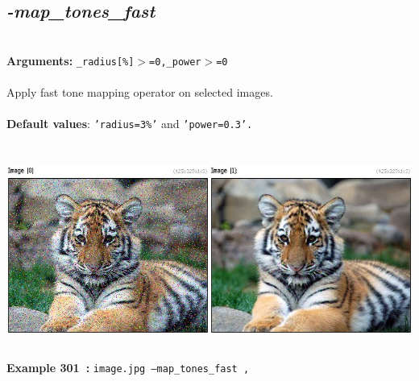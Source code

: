 \documentclass[a4paper,11pt,twoside]{book}
\begin{document}
\subsection{\emph{-map\_tones\_fast} }\vspace*{-0.5em}
~\\\textbf{Arguments: } 
{\small \texttt{\_radius[\%]$>$=0,\_power$>$=0}}\\~\\
Apply fast tone mapping operator on selected images.
~\\~\\\textbf{Default values}: {\small \texttt{'radius=3\%'} and \texttt{'power=0.3'.}}
\begin{center}\includegraphics[keepaspectratio=true,height=7cm,width=\textwidth]{img/gmic_def301.jpg}\\
{\footnotesize \textbf{Example 301~:} \texttt{image.jpg --map\_tones\_fast ,}}
\end{center}
\end{document}
